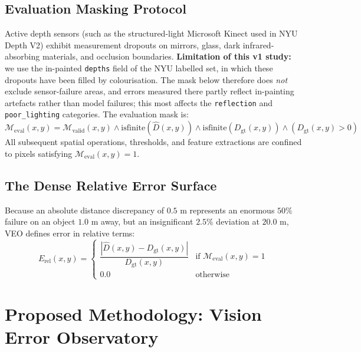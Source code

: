 \documentclass[11pt,a4paper]{article}
\begin{document}
\subsection{Evaluation Masking Protocol}
Active depth sensors (such as the structured-light Microsoft Kinect used in NYU Depth V2) exhibit measurement dropouts on mirrors, glass, dark infrared-absorbing materials, and occlusion boundaries. \textbf{Limitation of this v1 study:} we use the in-painted \texttt{depths} field of the NYU labelled set, in which these dropouts have been filled by colourisation. The mask below therefore does \emph{not} exclude sensor-failure areas, and errors measured there partly reflect in-painting artefacts rather than model failures; this most affects the \texttt{reflection} and \texttt{poor\_lighting} categories. The evaluation mask is:
\begin{equation}
\label{eq:eval_mask}
\mathcal{M}_{\mathrm{eval}}(x,y) = \mathcal{M}_{\mathrm{valid}}(x,y) \land \text{isfinite}(\hat{D}(x,y)) \land \text{isfinite}(D_{\mathrm{gt}}(x,y)) \land (D_{\mathrm{gt}}(x,y) > 0)
\end{equation}
All subsequent spatial operations, thresholds, and feature extractions are confined to pixels satisfying $\mathcal{M}_{\mathrm{eval}}(x,y) = 1$.

\subsection{The Dense Relative Error Surface}
Because an absolute distance discrepancy of $0.5\text{ m}$ represents an enormous $50\%$ failure on an object $1.0\text{ m}$ away, but an insignificant $2.5\%$ deviation at $20.0\text{ m}$, VEO defines error in relative terms:
\begin{equation}
\label{eq:rel_error}
E_{\mathrm{rel}}(x,y) = \begin{cases}
\dfrac{|\hat{D}(x,y) - D_{\mathrm{gt}}(x,y)|}{D_{\mathrm{gt}}(x,y)} & \text{if } \mathcal{M}_{\mathrm{eval}}(x,y) = 1 \\[0.8em]
0.0 & \text{otherwise}
\end{cases}
\end{equation}

\section{Proposed Methodology: Vision Error Observatory}
\label{sec:method}
\end{document}
